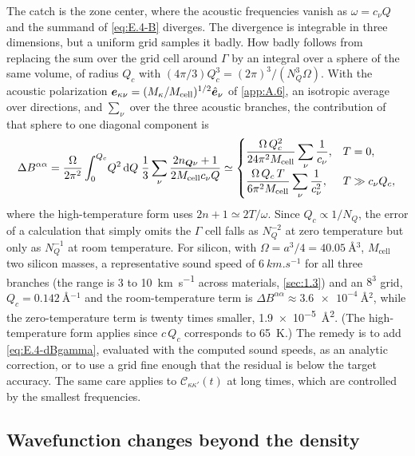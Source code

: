 The catch is the zone center, where the acoustic frequencies vanish as $\omega = c_\nu Q$ and the summand of \cref{eq:E.4-B} diverges. The divergence is integrable in three dimensions, but a uniform grid samples it badly. How badly follows from replacing the sum over the grid cell around $\Gamma$ by an integral over a sphere of the same volume, of radius $Q_c$ with $(4\pi/3)Q_c^3 = (2\pi)^3/(N_Q^3\Omega)$. With the acoustic polarization $\bm{e}_{\kappa\nu} = (M_\kappa/M_{\mathrm{cell}})^{1/2}\hat{\bm{e}}_\nu$ of \cref{app:A.6}, an isotropic average over directions, and $\sum_\nu$ over the three acoustic branches, the contribution of that sphere to one diagonal component is
\begin{equation}
  \Delta B^{\alpha\alpha} = \frac{\Omega}{2\pi^2}\int_0^{Q_c}\!Q^2\,\mathrm{d} Q\;\frac13\sum_\nu\frac{2n_{\bm{Q}\nu}+1}{2M_{\mathrm{cell}}c_\nu Q}
  \simeq
  \begin{cases}
    \dfrac{\Omega\,Q_c^2}{24\pi^2M_{\mathrm{cell}}}\displaystyle\sum_\nu\frac{1}{c_\nu}, & T = 0,\\[2ex]
    \dfrac{\Omega\,Q_c\,T}{6\pi^2M_{\mathrm{cell}}}\displaystyle\sum_\nu\frac{1}{c_\nu^2}, & T \gg c_\nu Q_c,
  \end{cases}
  \label{eq:E.4-dBgamma}
\end{equation}
where the high-temperature form uses $2n + 1 \simeq 2T/\omega$. Since $Q_c \propto 1/N_Q$, the error of a calculation that simply omits the $\Gamma$ cell falls as $N_Q^{-2}$ at zero temperature but only as $N_Q^{-1}$ at room temperature. For silicon, with $\Omega = a^3/4 = \SI{40.05}{\angstrom^3}$, $M_{\mathrm{cell}}$ two silicon masses, a representative sound speed of $\SI{6}{km.s^{-1}}$ for all three branches (the range is 3 to \SI{10}{km.s^{-1}} across materials, \cref{sec:1.3}) and an $8^3$ grid, $Q_c = \SI{0.142}{\angstrom^{-1}}$ and the room-temperature term is $\Delta B^{\alpha\alpha} \approx \SI{3.6e-4}{\angstrom^2}$, while the zero-temperature term is twenty times smaller, \SI{1.9e-5}{\angstrom^2}. (The high-temperature form applies since $c\,Q_c$ corresponds to \SI{65}{K}.) The remedy is to add \cref{eq:E.4-dBgamma}, evaluated with the computed sound speeds, as an analytic correction, or to use a grid fine enough that the residual is below the target accuracy. The same care applies to $\mathcal{C}_{\kappa\kappa'}(t)$ at long times, which are controlled by the smallest frequencies.

\subsection{Wavefunction changes beyond the density}


